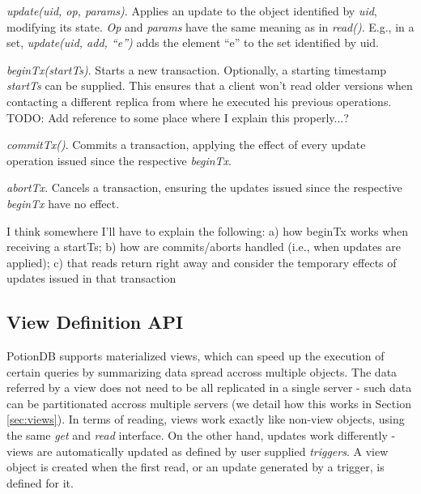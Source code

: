 \documentclass{vldb}
\newcommand{\grumbler}[2]{{\color{red}{\bf #1:} #2}}
\newcommand{\andre}[1]{\grumbler{andre}{#1}}
\begin{document}
\emph{update(uid, op, params)}. Applies an update to the object identified by \emph{uid}, modifying its state.
\emph{Op} and \emph{params} have the same meaning as in \emph{read()}.
E.g., in a set, \emph{update(uid, add, ``e'')} adds the element ``e'' to the set identified by uid.

\emph{beginTx(startTs)}. Starts a new transaction. Optionally, a starting timestamp \emph{startTs} can be supplied. This ensures that a client won't read older versions when contacting a different replica from where he executed his previous operations.
\andre{TODO: Add reference to some place where I explain this properly...?}

\emph{commitTx()}. Commits a transaction, applying the effect of every update operation issued since the respective \emph{beginTx}.

\emph{abortTx}. Cancels a transaction, ensuring the updates issued since the respective \emph{beginTx} have no effect.

\andre{I think somewhere I'll have to explain the following: a) how beginTx works when receiving a startTs; b) how are commits/aborts handled (i.e., when updates are applied); c) that reads return right away and consider the temporary effects of updates issued in that transaction}


%
%


\subsection{View Definition API}

PotionDB supports materialized views, which can speed up the execution of certain queries by summarizing data spread accross multiple objects.
The data referred by a view does not need to be all replicated in a single server - such data can be partitionated accross multiple servers (we detail how this works in Section \ref{sec:views}).
In terms of reading, views work exactly like non-view objects, using the same \emph{get} and \emph{read} interface.
On the other hand, updates work differently - views are automatically updated as defined by user supplied \emph{triggers}.
A view object is created when the first read, or an update generated by a trigger, is defined for it.
\end{document}
